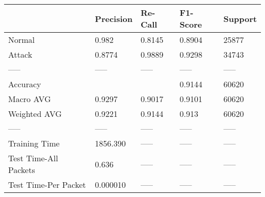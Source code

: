 \begin{tabular}{lllll}
\toprule
{} & Precision & Re-Call & F1-Score & Support \\
\midrule
Normal                &     0.982 &  0.8145 &   0.8904 &   25877 \\
Attack                &    0.8774 &  0.9889 &   0.9298 &   34743 \\
-----                 &     ----- &   ----- &    ----- &   ----- \\
Accuracy              &           &         &   0.9144 &   60620 \\
Macro AVG             &    0.9297 &  0.9017 &   0.9101 &   60620 \\
Weighted AVG          &    0.9221 &  0.9144 &    0.913 &   60620 \\
-----                 &     ----- &   ----- &    ----- &   ----- \\
Training Time         &  1856.390 &   ----- &    ----- &   ----- \\
Test Time-All Packets &     0.636 &   ----- &    ----- &   ----- \\
Test Time-Per Packet  &  0.000010 &   ----- &    ----- &   ----- \\
\bottomrule
\end{tabular}
